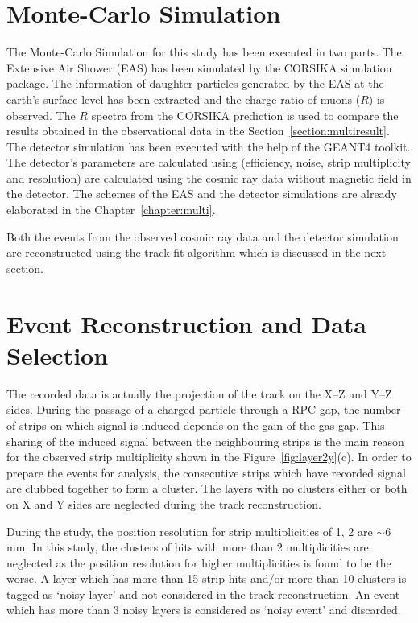 \section{Monte-Carlo Simulation}
The Monte-Carlo Simulation for this study has been executed in
two parts. The Extensive Air Shower (EAS) has been simulated
by the CORSIKA simulation package\cite{corsika763}. The information
of daughter particles generated by the EAS at the earth's surface
level has been extracted and the charge ratio of muons ($R$) is
observed. The $R$ spectra from the CORSIKA prediction is used to
compare the results obtained in the observational data in the
Section~\ref{section:multiresult}.
The detector simulation has been executed with the help
of the GEANT4 toolkit\cite{geant4}. The detector's parameters are
calculated using (efficiency, noise, strip multiplicity and
resolution) are calculated using the cosmic ray data without magnetic
field in the detector. The schemes of the EAS and the
detector simulations are already elaborated in the
Chapter~\ref{chapter:multi}.

Both the events from the observed cosmic ray data and the detector
simulation are reconstructed using the track fit algorithm which is
discussed in the next section.

\section{Event Reconstruction and Data Selection} \label{sec:momreco}
The recorded data is actually the projection of the track on the
\mbox{X--Z} and \mbox{Y--Z} sides. During the passage of a charged
particle through a RPC gap, the number of strips on which signal is
induced depends on the gain of the gas gap. This sharing of the induced
signal between the neighbouring strips is the main reason for the
observed strip multiplicity shown in the Figure~\ref{fig:layer2y}(c).
In order to prepare the events for analysis, the consecutive strips
which have recorded signal are clubbed together to form a cluster.
The layers with no clusters either or both on X and Y sides are
neglected during the track reconstruction.

During the study, the position resolution for strip multiplicities of
1, 2 are $\sim$6\,mm. In this study, the clusters of hits with more
than 2 multiplicities are neglected as the position resolution for
higher multiplicities is found to be the worse. A layer which has
more than 15 strip hits and/or more than 10 clusters is tagged as
`noisy layer' and not considered in the track reconstruction. An
event which has more than 3 noisy layers is considered as
`noisy event' and discarded.


